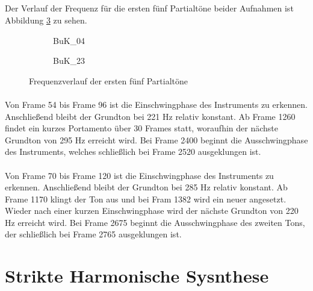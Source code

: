 \subsection{}
Der Verlauf der Frequenz für die ersten fünf Partialtöne beider Aufnahmen ist Abbildung \ref{fig:freq} zu sehen.

\begin{figure}[H]
    \centering
    \begin{subfigure}{.5\textwidth}
        \centering
        \caption{BuK\_04}
        \scalebox{0.5}{}
        \label{fig:freq04}
    \end{subfigure}%
    \begin{subfigure}{.5\textwidth}
        \centering
        \caption{BuK\_23}
        \scalebox{0.5}{}
        \label{fig:freq23}
    \end{subfigure}
    \caption{Frequenzverlauf der ersten fünf Partialtöne}
    \label{fig:freq}
\end{figure}

\paragraph{}
Von Frame 54 bis Frame 96 ist die Einschwingphase des Instruments zu erkennen.
Anschließend bleibt der Grundton bei 221 Hz relativ konstant.
Ab Frame 1260 findet ein kurzes Portamento über 30 Frames statt, woraufhin der nächste Grundton von 295 Hz erreicht wird.
Bei Frame 2400 beginnt die Ausschwingphase des Instruments, welches schließlich bei Frame 2520 ausgeklungen ist.

\paragraph{}
Von Frame 70 bis Frame 120 ist die Einschwingphase des Instruments zu erkennen.
Anschließend bleibt der Grundton bei 285 Hz relativ konstant.
Ab Frame 1170 klingt der Ton aus und bei Fram 1382 wird ein neuer angesetzt.
Wieder nach einer kurzen Einschwingphase wird der nächste Grundton von 220 Hz erreicht wird.
Bei Frame 2675 beginnt die Ausschwingphase des zweiten Tons, der schließlich bei Frame 2765 ausgeklungen ist.


\section{Strikte Harmonische Sysnthese}
\label{sec:2}

